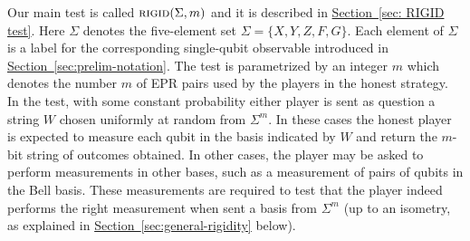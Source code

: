\documentclass[11pt]{article}
\numberwithin{equation}{section}
\theoremstyle{definition}
\theoremstyle{plain}
\newcommand{\expref}[2]{\hyperref[#2]{#1~\ref{#2}}}
\newcommand{\rigid}{\textsc{rigid}}
\begin{document}
Our main test is called $\rigid(\Sigma,m)$ and it is described in \expref{Section}{sec: RIGID test}. Here $\Sigma$ denotes the five-element set $\Sigma = \{X,Y,Z,F,G\}$. Each element of $\Sigma$ is a label for the corresponding single-qubit observable introduced in \expref{Section}{sec:prelim-notation}. The test is parametrized by an integer $m$ which denotes the number $m$ of EPR pairs used by the players in the honest strategy. In the test, with some constant probability either player is sent as question a string $W$ chosen uniformly at random from $\Sigma^m$. In these cases the honest player is expected to measure each qubit in the basis indicated by $W$ and return the $m$-bit string of outcomes obtained. In other cases, the player may be asked to perform measurements in other bases, such as a measurement of pairs of qubits in the Bell basis. These measurements are required to test that the player indeed performs the right measurement when sent a basis from $\Sigma^m$ (up to an isometry, as explained in \expref{Section}{sec:general-rigidity} below). 
\end{document}
